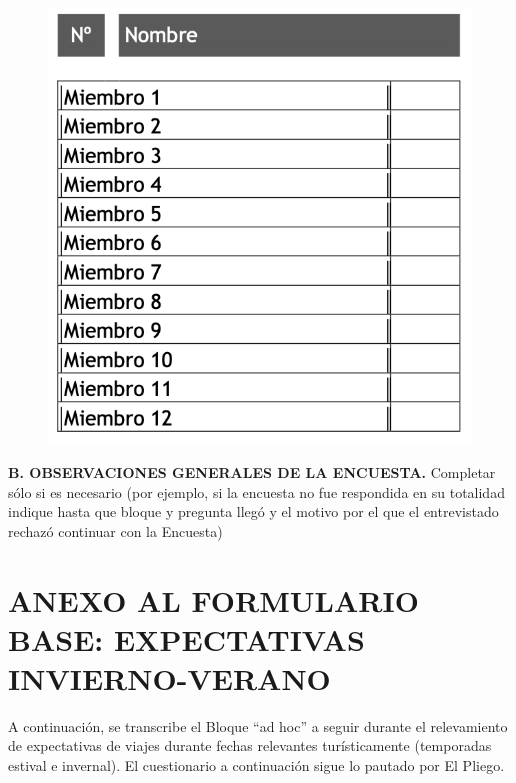 \documentclass[
  openany]{book}
\begin{document}
\begin{figure}

{\centering \includegraphics[width=1\linewidth]{imagenes/figura6-303} 

}

\end{figure}

\textbf{B. OBSERVACIONES GENERALES DE LA ENCUESTA.}
Completar sólo si es necesario (por ejemplo, si la encuesta no fue respondida en su totalidad indique hasta que bloque y pregunta llegó y el motivo por el que el entrevistado rechazó continuar con la Encuesta)

\hypertarget{anexo-al-formulario-base-expectativas-invierno-verano}{%
\section{\texorpdfstring{\textbf{ANEXO AL FORMULARIO BASE: EXPECTATIVAS INVIERNO-VERANO}}{ANEXO AL FORMULARIO BASE: EXPECTATIVAS INVIERNO-VERANO}}\label{anexo-al-formulario-base-expectativas-invierno-verano}}

A continuación, se transcribe el Bloque ``ad hoc'' a seguir durante el relevamiento de expectativas de viajes durante fechas relevantes turísticamente (temporadas estival e invernal). El cuestionario a continuación sigue lo pautado por El Pliego.
\end{document}
